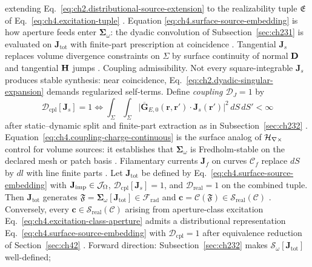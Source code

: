 extending Eq.~\eqref{eq:ch2.distributional-source-extension} to the realizability tuple
\(\mathfrak{E}\) of Eq.~\eqref{eq:ch4.excitation-tuple} \cite{stratton1941}. Equation
\eqref{eq:ch4.surface-source-embedding} is how aperture feeds enter \(\boldsymbol{\Sigma}_\omega\): the
dyadic convolution of Subsection~\ref{sec:ch231} is evaluated on \(\mathbf{J}_{\mathrm{tot}}\) with
finite-part prescription at coincidence \cite{harrington2001}. Tangential \(\mathbf{J}_{s}\)
replaces volume divergence constraints on \(\Sigma\) by surface continuity of normal \(\mathbf{D}\) and
tangential \(\mathbf{H}\) jumps \cite{stratton1941}.
Coupling admissibility. Not every square-integrable \(\mathbf{J}_{s}\) produces stable synthesis: near coincidence,
Eq.~\eqref{eq:ch2.dyadic-singular-expansion} demands regularized self-terms. Define
\emph{coupling $\mathcal{D}_J=1$} by
\begin{equation}
\label{eq:ch4.coupling-admissibility}
\mathcal{D}_{\mathrm{cpl}}[\mathbf{J}_{s}]
=
1
\iff
\int_{\Sigma}\!\int_{\Sigma}
\big|\overline{\mathbf{G}}_{E,0}(\mathbf{r},\mathbf{r}')\cdot\mathbf{J}_{s}(\mathbf{r}')\big|^{2}\,dS\,dS'
<
\infty
\end{equation}
after static--dynamic split and finite-part extraction as in Subsection~\ref{sec:ch232}
\cite{harrington2001}. Equation~\eqref{eq:ch4.coupling-charge-continuous} is the surface
analog of \(\mathcal{H}_{\nabla\times}\) control for volume sources: it establishes that \(\boldsymbol{\Sigma}_\omega\) is
Fredholm-stable on the declared mesh or patch basis \cite{harrington2001}. Filamentary currents
\(\mathbf{J}_{f}\) on curves \(\mathcal{C}_{f}\) replace \(dS\) by \(dl\) with line finite parts
\cite{stratton1941}.
\label{prop:ch4.distributional-realizability}
Let \(\mathbf{J}_{\mathrm{tot}}\) be defined by Eq.~\eqref{eq:ch4.surface-source-embedding} with
\(\mathbf{J}_{\mathrm{imp}}\in\mathcal{J}_\Omega\), \(\mathcal{D}_{\mathrm{cpl}}[\mathbf{J}_{s}]=1\), and
\(\mathcal{D}_{\mathrm{real}}=1\) on the combined tuple. Then \(\mathbf{J}_{\mathrm{tot}}\) generates
\(\mathfrak{F}=\boldsymbol{\Sigma}_\omega[\mathbf{J}_{\mathrm{tot}}]\in\mathcal{F}_{\mathrm{rad}}\) and
\(\mathbf{c}=\mathcal{C}(\mathfrak{F})\in\mathcal{S}_{\mathrm{real}}(\mathcal{C})\) \cite{stratton1941}.
Conversely, every \(\mathbf{c}\in\mathcal{S}_{\mathrm{real}}(\mathcal{C})\) arising from aperture-class
excitation Eq.~\eqref{eq:ch4.excitation-class-aperture} admits a distributional representation
Eq.~\eqref{eq:ch4.surface-source-embedding} with \(\mathcal{D}_{\mathrm{cpl}}=1\) after equivalence
reduction of Section~\ref{sec:ch42} \cite{collin2001}.
Forward direction: Subsection~\ref{sec:ch232} makes \(\mathcal{S}_\omega[\mathbf{J}_{\mathrm{tot}}]\) well-defined;
